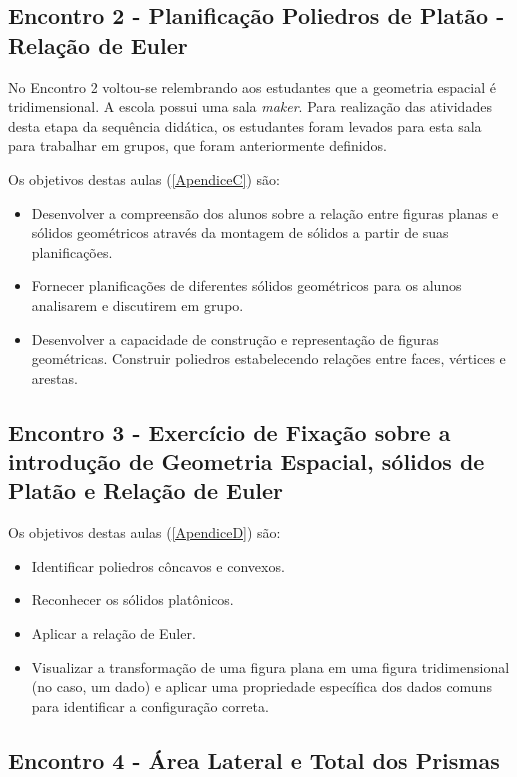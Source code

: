 \subsection{Encontro 2 - Planificação Poliedros de Platão - Relação de Euler}

No Encontro 2 voltou-se relembrando aos estudantes que a geometria espacial é tridimensional.  A escola possui uma sala \textit{maker}. Para realização das atividades desta etapa da sequência didática, os estudantes foram levados para esta sala para trabalhar em grupos, que foram anteriormente definidos.

Os objetivos destas aulas (\autoref{ApendiceC}) são:

\begin{itemize}
    \item Desenvolver a compreensão dos alunos sobre a relação entre figuras planas e sólidos geométricos através da montagem de sólidos a partir de suas planificações.
    \item Fornecer planificações de diferentes sólidos geométricos para os alunos analisarem e discutirem em grupo.
    \item Desenvolver a capacidade de construção e representação de figuras geométricas. Construir poliedros estabelecendo relações entre faces, vértices e arestas.
\end{itemize}

\subsection{Encontro 3 - Exercício de Fixação sobre a introdução de Geometria Espacial, sólidos de Platão e Relação de Euler}

Os objetivos destas aulas (\autoref{ApendiceD}) são:

\begin{itemize}
    \item Identificar poliedros côncavos e convexos.
    \item Reconhecer os sólidos platônicos.
    \item Aplicar a relação de Euler.
    \item Visualizar a transformação de uma figura plana em uma figura tridimensional (no caso, um dado) e aplicar uma propriedade específica dos dados comuns para identificar a configuração correta.
\end{itemize}

\subsection{Encontro 4 - Área Lateral e Total dos Prismas}

